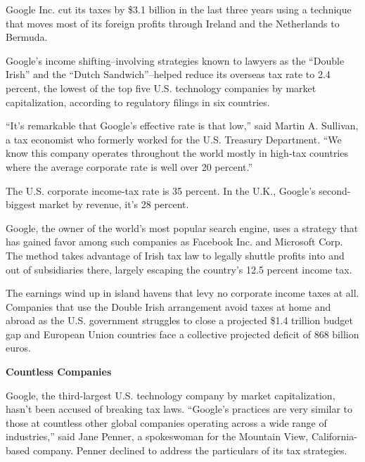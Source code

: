 \begin{select}

Google Inc. cut its taxes by \$3.1 billion in the last three years using a technique that moves most of its foreign profits through Ireland and the Netherlands to Bermuda.

Google's income shifting--involving strategies known to lawyers as the ``Double Irish'' and the ``Dutch Sandwich''--helped reduce its overseas tax rate to 2.4 percent, the lowest of the top five U.S. technology companies by market capitalization, according to regulatory filings in six countries.

``It's remarkable that Google's effective rate is that low,'' said Martin A. Sullivan, a tax economist who formerly worked for the U.S. Treasury Department. ``We know this company operates throughout the world mostly in high-tax countries where the average corporate rate is well over 20 percent.''

The U.S. corporate income-tax rate is 35 percent. In the U.K., Google's second-biggest market by revenue, it's 28 percent.

Google, the owner of the world's most popular search engine, uses a strategy that has gained favor among such companies as Facebook Inc. and Microsoft Corp. The method takes advantage of Irish tax law to legally shuttle profits into and out of subsidiaries there, largely escaping the country's 12.5 percent income tax. 

The earnings wind up in island havens that levy no corporate income taxes at all. Companies that use the Double Irish arrangement avoid taxes at home and abroad as the U.S. government struggles to close a projected \$1.4 trillion budget gap and European Union countries face a collective projected deficit of 868 billion euros.

\begin{center} \textbf{Countless Companies}
\end{center}

Google, the third-largest U.S. technology company by market capitalization, hasn't been accused of breaking tax laws. ``Google's practices are very similar to those at countless other global companies operating across a wide range of industries,'' said Jane Penner, a spokeswoman for the Mountain View, California-based company. Penner declined to address the particulars of its tax strategies.


\end{select}
